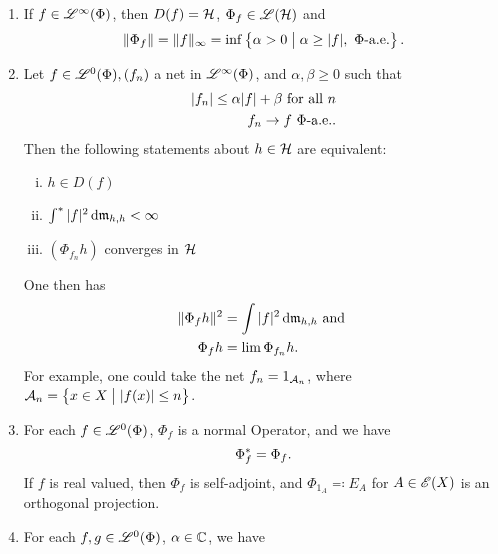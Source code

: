 





\newpage






















\begin{thrm}
  \leavevmode
  \begin{enumerate}
   \item   

 If $f \in \mathscr{L}^\infty (\Phi)$, then $D(f) = \mathcal{H}$, $ \Phi_f \in \mathscr{L}(\mathcal{H})$ and
 \[
 \| \Phi_f \| = \| f\|_\infty = \inf \left\lbrace \alpha > 0 \bigm | \alpha \geq |f|, ~\Phi\text{-a.e.}\right\rbrace.
 \]

 
\item 
Let $f \in \mathscr{L}^0(\Phi), (f_n)$ a net in $\mathscr{L}^\infty (\Phi)$, and $\alpha, \beta \geq 0$ such that
 \begin{align*}
   | f_n | \leq \alpha |f| + \beta \text{ for all } n \\
   f_n \to f ~\Phi\text{-a.e.}.
 \end{align*}
Then the following statements about $h \in \mathcal{H}$ are equivalent:
\begin{enumerate}[(i)]
 \item $h \in D(f)$
 \item $\int ^{*} | f| ^2 \operatorname{d}\! \mathfrak{m}_{h,h} < \infty$
 \item $(\Phi_{f_n}h)$ converges in $ \mathcal{H}$
\end{enumerate}
One then has
\begin{align*}
  \| \Phi_f h \| ^2 &= \int |f|^2 \operatorname{d}\! \mathfrak{m}_{h, h } \text{ and }\\
  \Phi_{f }h &= \lim \Phi_{f_n} h.
\end{align*}
For example, one could take the net $f_n = 1_{\mathcal{A}_n}$, where $\mathcal{A}_n = \left\lbrace x \in X \bigm | | f(x) | \leq n \right\rbrace$.

\item
For each $f \in \mathscr{L}^0(\Phi)$, $\Phi_f$ is a normal Operator, and we have
\[
 \Phi_f ^{*} = \Phi_f. 
\]
If $f$ is real valued, then $\Phi_f$ is self-adjoint, and $\Phi_{1_A} \eqqcolon E_A$ for $ A \in \mathscr{E}(X)$ is an orthogonal projection. 

\item 
For each $f, g \in \mathscr{L}^0(\Phi)$, $\alpha \in \mathbb{C}$, we have


\end{enumerate}
\end{thrm}
